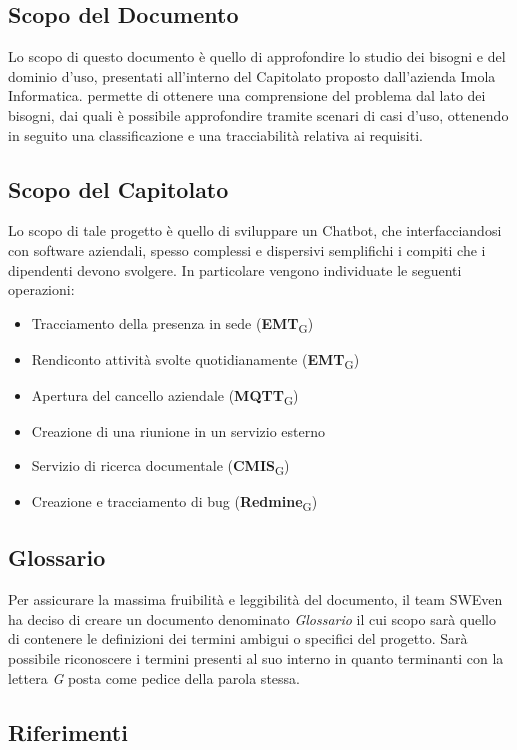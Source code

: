 \subsection{Scopo del Documento}
Lo scopo di questo documento è quello di approfondire lo studio dei bisogni e del dominio d'uso, presentati all'interno del Capitolato proposto dall'azienda Imola Informatica.\newline {} permette di ottenere una comprensione del problema dal lato dei bisogni, dai quali è possibile approfondire tramite scenari di casi d'uso, ottenendo in seguito una classificazione e una tracciabilità relativa ai requisiti. 

\subsection{Scopo del Capitolato}
Lo scopo di tale progetto è quello di sviluppare un Chatbot, che interfacciandosi con software aziendali, spesso complessi e dispersivi semplifichi i compiti che i dipendenti devono svolgere. In particolare vengono individuate le seguenti operazioni: 
\begin{itemize}
    \item Tracciamento della presenza in sede (\textbf{EMT}\textsubscript{G})
    \item Rendiconto attività svolte quotidianamente (\textbf{EMT}\textsubscript{G})
    \item Apertura del cancello aziendale (\textbf{MQTT}\textsubscript{G})
    \item Creazione di una riunione in un servizio esterno
    \item Servizio di ricerca documentale (\textbf{CMIS}\textsubscript{G})
    \item Creazione e tracciamento di bug (\textbf{Redmine}\textsubscript{G})
\end{itemize}

\subsection{Glossario}
Per assicurare la massima fruibilità e leggibilità del documento, il team SWEven ha deciso di creare un documento denominato \textit{Glossario} il cui scopo sarà quello di contenere le definizioni dei termini ambigui o specifici del progetto. Sarà possibile riconoscere i termini presenti al suo interno in quanto terminanti con la lettera \textit{G} posta come pedice della parola stessa. 
\subsection{Riferimenti}


